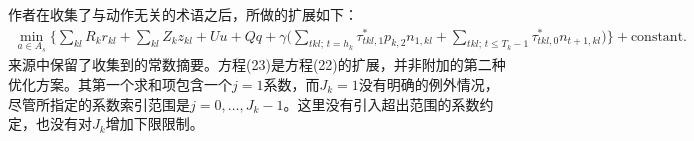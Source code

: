 \documentclass{article}
\begin{document}
作者在收集了与动作无关的术语之后，所做的扩展如下：
\begin{equation}
\begin{split}
\min_{a\in A_s}\Biggl\{
\sum_{kl}R_kr_{kl}+\sum_{kl}Z_kz_{kl}+Uu+Qq
+\gamma\Biggl(
\sum_{tkl;\,t=h_k}\tau^*_{tkl,1}p_{k,2}n_{1,kl}
+\sum_{tkl;\,t\leq T_k-1}\tau^*_{tkl,0}n_{t+1,kl}
\Biggr)\Biggr\}
+\text{constant}.
\end{split}
\tag{23}
\end{equation}
来源中保留了收集到的常数摘要。方程(23)是方程(22)的扩展，并非附加的第二种优化方案。其第一个求和项包含一个$j=1$系数，而$J_k=1$没有明确的例外情况，尽管所指定的系数索引范围是$j=0,\ldots,J_k-1$。这里没有引入超出范围的系数约定，也没有对$J_k$增加下限限制。
\end{document}
